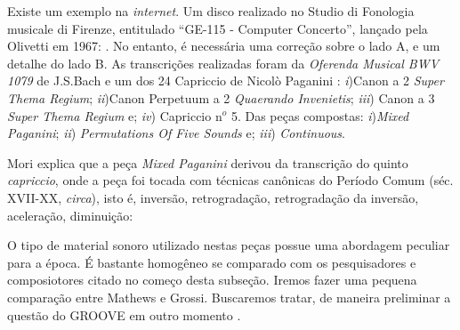 Existe um exemplo na \emph{internet}. Um disco realizado no Studio di Fonologia musicale di Firenze, entitulado ``GE-115 - Computer Concerto'', lançado pela Olivetti em 1967: . No entanto, é necessária uma correção sobre o lado A, e um detalhe do lado B. As transcrições realizadas foram da \emph{Oferenda Musical BWV 1079} de J.S.Bach e um dos 24 Capriccio de Nicolò Paganini : \emph{i})Canon a 2 \emph{Super Thema Regium}; \emph{ii})Canon Perpetuum a 2 \emph{Quaerando Invenietis}; \emph{iii}) Canon a 3 \emph{Super Thema Regium} e; \emph{iv}) Capriccio n$^o$ 5. Das peças compostas:  \emph{i})\emph{Mixed Paganini}; \emph{ii}) \emph{Permutations Of Five Sounds} e; \emph{iii}) \emph{Continuous}.


Mori explica que a peça \emph{Mixed Paganini} derivou da transcrição do quinto \emph{capriccio}, onde a peça foi tocada com técnicas canônicas do Período Comum (séc. XVII-XX, \emph{circa}), isto é, inversão, retrogradação, retrogradação da inversão, aceleração, diminuição:

\begin{citacao}
\end{citacao}

O tipo de material sonoro utilizado nestas peças possue uma abordagem peculiar para a época. É bastante homogêneo se comparado com os pesquisadores e composiotores citado no começo desta subseção. Iremos fazer uma pequena comparação entre Mathews e Grossi. Buscaremos tratar, de maneira preliminar a questão do GROOVE em outro momento .

